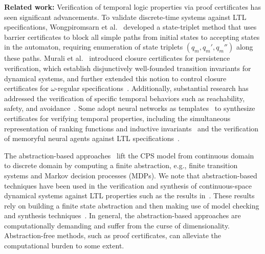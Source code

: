 \textbf{Related work: } 
Verification of temporal logic properties via proof certificates has seen significant advancements. To validate discrete-time systems against LTL specifications, Wongpiromsarn et al.~\cite{wongpiromsarn2015automata} developed a state-triplet method that uses barrier certificates to block all simple paths from initial states to accepting states in the automaton, requiring enumeration of state triplets $(q_m, q_m', q_m'')$ along these paths. Murali et al.~\cite{murali2024closure} introduced closure certificates for persistence verification, which establish disjunctively well-founded transition invariants \cite{podelski2004transition} for dynamical systems, and further extended this notion to control closure certificates for $\omega$-regular specifications~\cite{murali2025control}. Additionally, substantial research has addressed the verification of specific temporal behaviors such as reachability, safety, and avoidance~\cite{chakarov2013probabilistic,chatterjee2016algorithmic,chatterjee2024sound,chatterjee2024equivalence}. Some adopt neural networks as templates~\cite{wang2025verifying, nadali2024neural, zhao2020synthesizing} to synthesize certificates for verifying temporal properties, including the simultaneous representation of ranking functions and inductive invariants~\cite{giacobbe2025let} and the verification of memoryful neural agents against LTL specifications~\cite{hosseini2025ltl}.


The abstraction-based approaches~\cite{vasile2016control, leahy2019control, kress2009temporal, coogan2015traffic, fainekos2009temporal, ding2014optimal, wongpiromsarn2009receding} lift the CPS model from continuous domain to discrete domain by computing a finite abstraction, e.g., finite transition systems and Markov decision processes (MDPs). We note that abstraction-based techniques have been used in the verification and synthesis of continuous-space dynamical systems against LTL properties such as the results in~\cite{henzinger1997hytech, khaled2021omegathreads, lahijanian2011temporal, rungger2016scots}. These results rely on building a finite state abstraction and then making use of model checking and synthesis techniques~\cite{baier2008principles, tabuada2009verification}. In general, the abstraction-based approaches are computationally demanding and suffer from the curse of dimensionality. Abstraction-free methods, such as proof certificates, can alleviate the computational burden to some extent.


